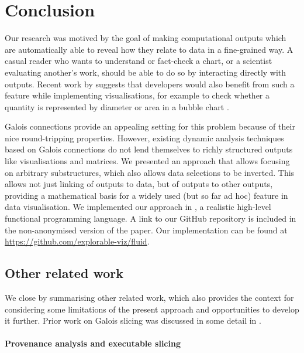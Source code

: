 \section{Conclusion}
\label{sec:conclusion}

Our research was motived by the goal of making computational outputs which are automatically able to reveal how they relate to data in a fine-grained way. A casual reader who wants to understand or fact-check a chart, or a scientist evaluating another's work, should be able to do so by interacting directly with outputs. Recent work by \citeauthor{walny19} suggests that developers would also benefit from such a feature while implementing visualisations, for example to check whether a quantity is represented by diameter or area in a bubble chart \cite{walny19}.

Galois connections provide an appealing setting for this problem because of their nice round-tripping properties. However,  existing dynamic analysis techniques based on Galois connections do not lend themselves to richly structured outputs like visualisations and matrices. We presented an approach that allows focusing on arbitrary substructures, which also allows data selections to be inverted. This allows not just linking of outputs to data, but of outputs to other outputs, providing a mathematical basis for a widely used (but so far ad hoc) feature in data visualisation. We implemented our approach in \OurLanguage, a realistic high-level functional programming language. %
\ifanonymous%
   A link to our GitHub repository is included in the non-anonymised version of the paper.
\else%
   Our implementation can be found at \url{https://github.com/explorable-viz/fluid}.%
\fi%

\subsection{Other related work}
\label{sec:conclusion:other-related-work}

We close by summarising other related work, which also provides the context for considering some limitations of the present approach and opportunities to develop it further. Prior work on Galois slicing \cite{perera12a,ricciotti17,perera16d} was discussed in some detail in .

\paragraph{Provenance analysis and executable slicing}


